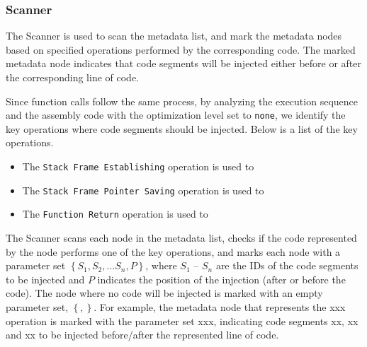 \subsubsection{Scanner}

The Scanner is used to scan the metadata list, and mark the metadata nodes based on specified operations performed by the corresponding code. The marked metadata node indicates that code segments will be injected either before or after the corresponding line of code.

Since function calls follow the same process, by analyzing the execution sequence and the assembly code with the optimization level set to \texttt{none}, we identify the key operations where code segments should be injected. Below is a list of the key operations.

\begin{itemize}
\item The \texttt{Stack Frame Establishing} operation is used to 
\item The \texttt{Stack Frame Pointer Saving} operation is used to 
\item The \texttt{Function Return} operation is used to 
\end{itemize}

The Scanner scans each node in the metadata list, checks if the code represented by the node performs one of the key operations, and marks each node with a parameter set $\left\{S_{1}, S_{2}, ... S_{n}, P\right\}$, where $S_{1}$ -- $S_{n}$ are the IDs of the code segments to be injected and $P$ indicates the position of the injection (after or before the code). The node where no code will be injected is marked with an empty parameter set, $\left\{, \right\}$. For example, the metadata node that represents the xxx operation is marked with the parameter set xxx, indicating code segments xx, xx and xx to be injected before/after the represented line of code.

